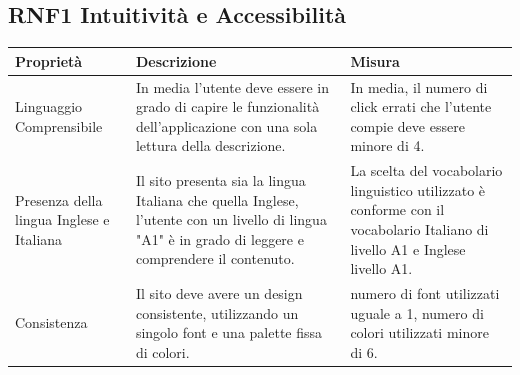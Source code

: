 \documentclass{report}
\begin{document}
\subsection*{RNF1 Intuitività e Accessibilità}
\begin{center} %
	\centering
	\begin{tabular}{ |p{3cm}|p{4cm}|p{4cm}|  }
		\hline
		\centering Proprietà & \qquad\quad Descrizione & \qquad\qquad Misura\\ %
		\hline
		Linguaggio Comprensibile & In media l’utente deve essere in grado di capire le funzionalità dell'applicazione con una
		sola lettura della descrizione. & In media, il numero di click errati che l'utente compie deve essere minore di 4. \\
		\hline
		Presenza della lingua Inglese e Italiana & Il sito presenta sia la lingua Italiana che quella Inglese, l'utente con un livello di lingua "A1" è in grado di leggere e comprendere il contenuto. & La scelta del vocabolario linguistico utilizzato è conforme con il vocabolario Italiano di livello A1 e Inglese livello A1.\\ %
		\hline
		Consistenza & Il sito deve avere un design consistente, utilizzando un singolo font e una palette fissa di colori. & numero di font utilizzati uguale a 1, numero di colori utilizzati minore di 6.  \\%
		\hline
	\end{tabular}
\end{center}
\end{document}
